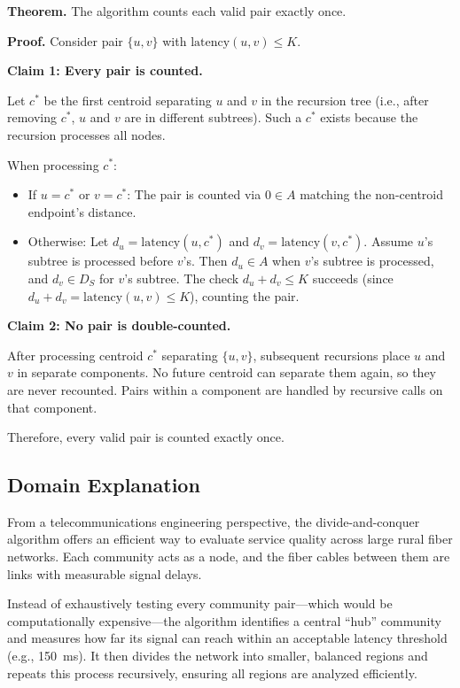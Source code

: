 \documentclass[sigconf]{acmart}
\begin{document}
\textbf{Theorem.} The algorithm counts each valid pair exactly once.

\textbf{Proof.}
Consider pair $\{u, v\}$ with $\text{latency}(u, v) \leq K$.

\textbf{Claim 1: Every pair is counted.}

Let $c^*$ be the first centroid separating $u$ and $v$ in the recursion tree (i.e., after removing $c^*$, $u$ and $v$ are in different subtrees). Such a $c^*$ exists because the recursion processes all nodes.

When processing $c^*$:

\begin{itemize}[itemsep=0.2em]
\item If $u = c^*$ or $v = c^*$: The pair is counted via $0 \in A$ matching the non-centroid endpoint's distance.
\item Otherwise: Let $d_u = \text{latency}(u, c^*)$ and $d_v = \text{latency}(v, c^*)$. Assume $u$'s subtree is processed before $v$'s. Then $d_u \in A$ when $v$'s subtree is processed, and $d_v \in D_S$ for $v$'s subtree. The check $d_u + d_v \leq K$ succeeds (since $d_u + d_v = \text{latency}(u, v) \leq K$), counting the pair.
\end{itemize}

\textbf{Claim 2: No pair is double-counted.}

After processing centroid $c^*$ separating $\{u, v\}$, subsequent recursions place $u$ and $v$ in separate components. No future centroid can separate them again, so they are never recounted. Pairs within a component are handled by recursive calls on that component.

Therefore, every valid pair is counted exactly once.

\subsection{Domain Explanation}
\label{subsec:domain-dc}

From a telecommunications engineering perspective, the divide-and-conquer algorithm offers an efficient way to evaluate service quality across large rural fiber networks. Each community acts as a node, and the fiber cables between them are links with measurable signal delays. 

Instead of exhaustively testing every community pair—which would be computationally expensive—the algorithm identifies a central ``hub'' community and measures how far its signal can reach within an acceptable latency threshold (e.g., 150~ms). It then divides the network into smaller, balanced regions and repeats this process recursively, ensuring all regions are analyzed efficiently.
\end{document}
